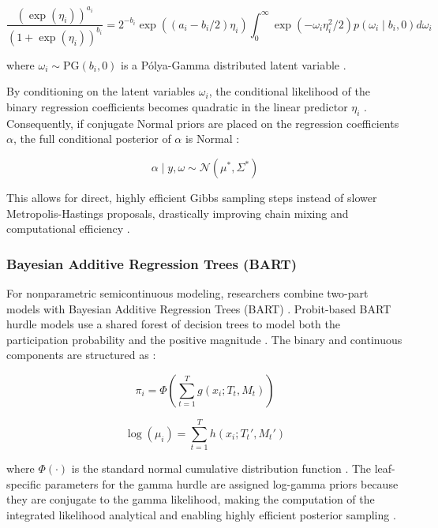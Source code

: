 \documentclass[11pt, a4paper]{article}
\begin{document}
\begin{equation}
\frac{(\exp(\eta_i))^{a_i}}{(1 + \exp(\eta_i))^{b_i}} = 2^{-b_i} \exp((a_i - b_i/2)\eta_i) \int_{0}^{\infty} \exp(-\omega_i \eta_i^2/2) p(\omega_i \mid b_i, 0) d\omega_i
\end{equation}

where $\omega_i \sim \text{PG}(b_i, 0)$ is a P\'{o}lya-Gamma distributed latent variable \cite{ref44}.

By conditioning on the latent variables $\omega_i$, the conditional likelihood of the binary regression coefficients becomes quadratic in the linear predictor $\eta_i$ \cite{ref44}. Consequently, if conjugate Normal priors are placed on the regression coefficients $\alpha$, the full conditional posterior of $\alpha$ is Normal \cite{ref44}:

\begin{equation}
\alpha \mid y, \omega \sim \mathcal{N}(\mu^*, \Sigma^*)
\end{equation}

This allows for direct, highly efficient Gibbs sampling steps instead of slower Metropolis-Hastings proposals, drastically improving chain mixing and computational efficiency \cite{ref1, ref42, ref44, ref45}.

\subsubsection{Bayesian Additive Regression Trees (BART)}
For nonparametric semicontinuous modeling, researchers combine two-part models with Bayesian Additive Regression Trees (BART) \cite{ref21}. Probit-based BART hurdle models use a shared forest of decision trees to model both the participation probability and the positive magnitude \cite{ref21}. The binary and continuous components are structured as \cite{ref21}:

\begin{equation}
\pi_i = \Phi\left(\sum_{t=1}^T g(x_i; T_t, M_t)\right)
\end{equation}

\begin{equation}
\log(\mu_i) = \sum_{t=1}^T h(x_i; T_t', M_t')
\end{equation}

where $\Phi(\cdot)$ is the standard normal cumulative distribution function \cite{ref21, ref33}. The leaf-specific parameters for the gamma hurdle are assigned log-gamma priors because they are conjugate to the gamma likelihood, making the computation of the integrated likelihood analytical and enabling highly efficient posterior sampling \cite{ref21}.
\end{document}
